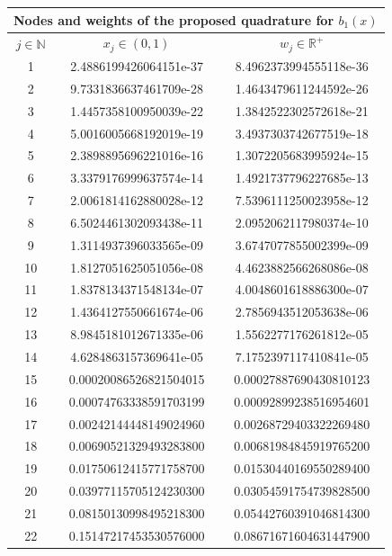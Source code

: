 \documentclass[a4paper, twosided]{book}
\begin{document}
\newpage
\vspace{0.2cm}
\begin{table}[H]
\centering
\begin{tabular}{|c||c|c|}
\hline
\multicolumn{3}{|c|}{\textbf{Nodes and weights of the proposed quadrature for $b_1(x)$ }} \\
\hline
$j\in\mathbb{N}$ & $x_j\in(0,1)$ & $w_j\in\mathbb{R}^+$ \\
\hline
1   &  2.4886199426064151e-37  &  8.4962373994555118e-36  \\
2   &  9.7331836637461709e-28  &  1.4643479611244592e-26  \\
3   &  1.4457358100950039e-22  &  1.3842522302572618e-21  \\
4   &  5.0016005668192019e-19  &  3.4937303742677519e-18  \\
5   &  2.3898895696221016e-16  &  1.3072205683995924e-15  \\
6   &  3.3379176999637574e-14  &  1.4921737796227685e-13  \\
7   &  2.0061814162880028e-12  &  7.5396111250023958e-12  \\
8   &  6.5024461302093438e-11  &  2.0952062117980374e-10  \\
9   &  1.3114937396033565e-09  &  3.6747077855002399e-09  \\
10  &  1.8127051625051056e-08  &  4.4623882566268086e-08  \\
11  &  1.8378134371548134e-07  &  4.0048601618886300e-07  \\
12  &  1.4364127550661674e-06  &  2.7856943512053638e-06  \\
13  &  8.9845181012671335e-06  &  1.5562277176261812e-05  \\
14  &  4.6284863157369641e-05  &  7.1752397117410841e-05  \\
15  &  0.00020086526821504015  &  0.00027887690430810123  \\
16  &  0.00074763338591703199  &  0.00092899238516954601  \\
17  &  0.00242144448149024960  &  0.00268729403322269480  \\
18  &  0.00690521329493283800  &  0.00681984845919765200  \\
19  &  0.01750612415771758700  &  0.01530440169550289400  \\
20  &  0.03977115705124230300  &  0.03054591754739828500  \\
21  &  0.08150130998495218300  &  0.05442760391046814300  \\
22  &  0.15147217453530576000  &  0.08671671604631447900  \\

\end{tabular}
\end{table}
\end{document}
